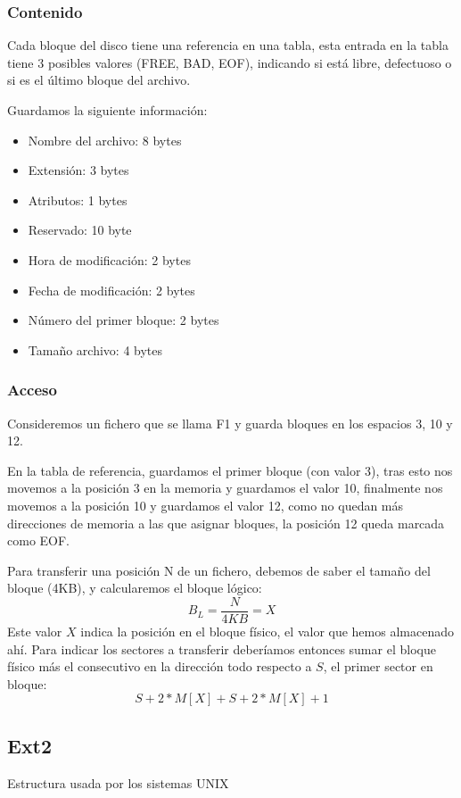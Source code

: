 \subsubsection{Contenido}
Cada bloque del disco tiene una referencia en una tabla, esta entrada en la tabla tiene 3 posibles valores (FREE, BAD, EOF), indicando si está libre, defectuoso o si es el último bloque del archivo.
\par  Guardamos la siguiente información:
\begin{itemize}
        \item Nombre del archivo: 8 bytes
        \item Extensión: 3 bytes
        \item Atributos: 1 bytes
        \item Reservado: 10 byte
        \item Hora de modificación: 2 bytes
        \item Fecha de modificación: 2 bytes
        \item Número del primer bloque: 2 bytes
        \item Tamaño archivo: 4 bytes
\end{itemize}
\subsubsection{Acceso}
Consideremos un fichero que se llama F1 y guarda bloques en los espacios 3, 10 y 12.
\par  En la tabla de referencia, guardamos el primer bloque (con valor 3), tras esto nos movemos a la posición 3 en la memoria y guardamos el valor 10, finalmente nos movemos a la posición 10 y guardamos el valor 12, como no quedan más direcciones de memoria a las que asignar bloques, la posición 12 queda marcada como EOF.
\par  Para transferir una posición N de un fichero, debemos de saber el tamaño del bloque (4KB), y calcularemos el bloque lógico:
\[
        \boxed{B_L = \frac{N}{4KB} = X}
\]
Este valor \(X\) indica la posición en el bloque físico, el valor que hemos almacenado ahí. Para indicar los sectores a transferir deberíamos entonces sumar el bloque físico más el consecutivo en la dirección todo respecto a \(S\), el primer sector en bloque:
\[
        \boxed{S + 2*M[X] + S + 2*M[X] + 1}
\]
\subsection{Ext2}
Estructura usada por los sistemas UNIX
